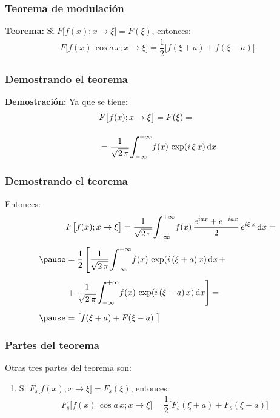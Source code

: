 \begin{frame}
\frametitle{Teorema de modulación}
\textbf{Teorema:} Si $F \big[ f (x); x \to \xi \big] = F (\xi)$, entonces:
\pause
\begin{align*}
F \big[ f (x) \, \cos a \, x; x \to \xi \big] = \dfrac{1}{2} \big[f (\xi + a) + f (\xi - a) \big]
\end{align*}
\end{frame}
\begin{frame}
\frametitle{Demostrando el teorema}
\textbf{Demostración:}
Ya que se tiene:
\pause
\begin{align*}
&F \big[f (x); x \to \xi \big] = F (\xi) = \\[1em]
&= \dfrac{1}{\sqrt{2 \, \pi}} \scaleint{6ex}_{\bs -\infty}^{+\infty} f (x) \, \exp(i \, \xi \, x) \dd{x}
\end{align*}
\end{frame}
\begin{frame}
\frametitle{Demostrando el teorema}
Entonces:
\pause
\begin{eqnarray*}
\begin{aligned}
&F \big[ f (x); x \to \xi \big] = \dfrac{1}{\sqrt{2 \, \pi}} \scaleint{6ex}_{\bs -\infty}^{+\infty} f (x) \, \dfrac{e^{i a x} + e^{-i a x}}{2} \, e^{i \xi \, x} \dd{x} = \\[0.5em] \pause
&= \dfrac{1}{2} \left[ \dfrac{1}{\sqrt{2 \, \pi}} \scaleint{6ex}_{\bs -\infty}^{+\infty} f (x) \, \exp(i \, (\xi + a) \, x)  \dd{x} + \right. \\[0.5em]
&+ \left. \dfrac{1}{\sqrt{2 \, \pi}} \scaleint{6ex}_{\bs -\infty}^{+\infty} f (x) \, \exp(i \, (\xi - a) \, x)  \dd{x} \right] = \\[0.5em] \pause
&= \big[ f (\xi + a) + F (\xi - a) \big]
\end{aligned}
\end{eqnarray*}
\end{frame}
\begin{frame}
\frametitle{Partes del teorema}
Otras tres partes del teorema son:
\pause
{}
\begin{enumerate}[<+->]
\item Si $F_{s} \big[ f (x); x \to \xi \big] = F_{s} (\xi)$, entonces:
\pause
\begin{align*}
F_{s} \big[ f (x) \, \cos a \, x; x \to \xi \big] = \dfrac{1}{2} \big[ F_{s} (\xi +  a) + F_{s} (\xi - a) \big]
\end{align*}
\seti
\end{enumerate}
\end{frame}
